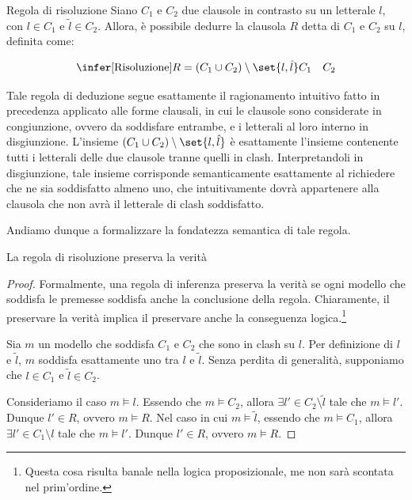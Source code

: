 \begin{definition}{Regola di risoluzione}
  Siano \(C_1\) e \(C_2\) due clausole in contrasto su un letterale \(l\), con \(l \in C_1\) e \(\tilde{l} \in C_2\). Allora, è possibile dedurre la clausola \(R\) detta  di \(C_1\) e \(C_2\) su \(l\), definita come:

  \[\infer[\text{Risoluzione}]{R = (C_1 \cup C_2)\setminus\set{l, \hat{l}}}{C_1 \quad C_2}\]

\end{definition}

Tale regola di deduzione segue esattamente il ragionamento intuitivo fatto in precedenza applicato alle forme clausali, in cui le clausole sono considerate in congiunzione, ovvero da soddisfare entrambe, e i letterali al loro interno in disgiunzione. L'insieme \((C_1 \cup C_2)\setminus\set{l, \hat{l}}\) è esattamente l'insieme contenente tutti i letterali delle due clausole tranne quelli in clash. Interpretandoli in disgiunzione, tale insieme corrisponde semanticamente esattamente al richiedere che ne sia soddisfatto almeno uno, che intuitivamente dovrà appartenere alla clausola che non avrà il letterale di clash soddisfatto.

Andiamo dunque a formalizzare la fondatezza semantica di tale regola.

\begin{proposition}{}
  La regola di risoluzione preserva la verità
\end{proposition}

\begin{proof}
  Formalmente, una regola di inferenza preserva la verità se ogni modello che soddisfa le premesse soddisfa anche la conclusione della regola.
  Chiaramente, il preservare la verità implica il preservare anche la conseguenza logica.\footnote{Questa cosa risulta banale nella logica proposizionale, me non sarà scontata nel prim'ordine.}

  Sia \(m\) un modello che soddisfa \(C_1\) e \(C_2\) che sono in clash su \(l\).
  Per definizione di \(l\) e \(\tilde{l}\), \(m\) soddisfa esattamente uno tra \(l\) e \(\tilde{l}\). Senza perdita di generalità, supponiamo che \(l\in C_1\) e \(\tilde{l}\in C_2\).

  Consideriamo il caso \(m\models l\). Essendo che \(m\models C_2\), allora \(\exists l' \in C_2\setminus{\tilde{l}}\) tale che \(m\models l'\). Dunque \(l' \in R\), ovvero \(m\models R\).
  Nel caso in cui \(m \models \tilde{l}\), essendo che \(m\models C_1\), allora \(\exists l' \in C_1\setminus{l}\) tale che \(m\models l'\). Dunque \(l' \in R\), ovvero \(m\models R\).
\end{proof}

